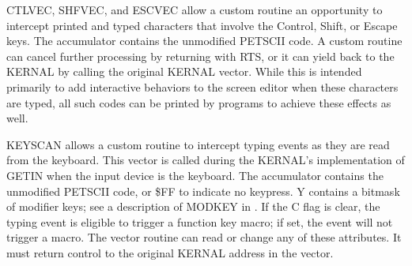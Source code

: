 \begin{description}[leftmargin=2cm,style=nextline]
        CTLVEC, SHFVEC, and ESCVEC allow a custom routine an opportunity to intercept printed and typed characters that involve the Control, Shift, or Escape keys. The accumulator contains the unmodified PETSCII code. A custom routine can cancel further processing by returning with RTS, or it can yield back to the KERNAL by calling the original KERNAL vector. While this is intended primarily to add interactive behaviors to the screen editor when these characters are typed, all such codes can be printed by programs to achieve these effects as well.

        KEYSCAN allows a custom routine to intercept typing events as they are read from the keyboard. This vector is called during the KERNAL's implementation of GETIN when the input device is the keyboard. The accumulator contains the unmodified PETSCII code, or \$FF to indicate no keypress. Y contains a bitmask of modifier keys; see a description of MODKEY in . If the C flag is clear, the typing event is eligible to trigger a function key macro; if set, the event will not trigger a macro. The vector routine can read or change any of these attributes. It must return control to the original KERNAL address in the vector.


\end{description}
